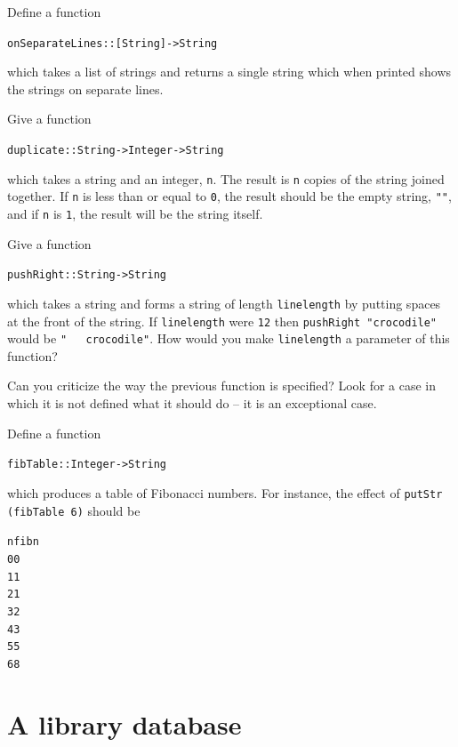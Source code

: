 \begin{exercises}
\item Define a function 
\begin{alltt}
onSeparateLines :: [String] -> String
\end{alltt}
which takes a list of strings and returns a single string which when printed
shows the strings on separate lines.

\item Give a function 
\begin{alltt}
duplicate :: String -> Integer -> String
\end{alltt}
which takes a string and an integer, \texttt{n}. The result is \texttt{n}
copies of the string joined together.
If \texttt{n} is less than or equal to \texttt{0}, the result should be
the empty string, \texttt{""}, and if \texttt{n} is \texttt{1}, the result will be the
string itself.

\item Give a function 
\begin{alltt}
pushRight :: String -> String
\end{alltt}
which takes a string and
forms a string of length \texttt{linelength} by putting spaces at the front of
the
string. If \texttt{linelength} were \texttt{12} then \texttt{pushRight "crocodile"}
would be \texttt{"\ \ \ crocodile"}. How would you make \texttt{linelength}
a parameter of this function?

\item Can you criticize the way the previous function is specified? Look for a
case in which it is not defined what it should do -- it is an exceptional
case.

\item
Define a function 
\begin{alltt}
fibTable :: Integer -> String
\end{alltt}
which produces a table of Fibonacci numbers. For instance, the effect of
\texttt{putStr (fibTable 6)}
should be
\begin{alltt}
        n        fib n
        0            0
        1            1
        2            1
        3            2
        4            3
        5            5
        6            8                
\end{alltt}


\end{exercises}


\section{A library database}
\label{library}

